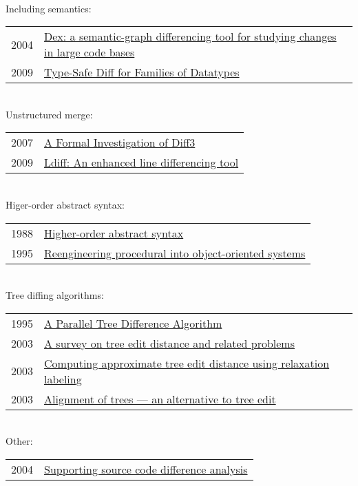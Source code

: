 \documentclass[12pt]{article}
\begin{document}
\\
Including semantics: \\
\begin{tabular}{ | l | l | }
	2004 & \href{http://ieeexplore.ieee.org/xpls/abs_all.jsp?arnumber=1357803&tag=1}{Dex: a semantic-graph differencing tool for studying changes in large code bases } \\
	2009 & \href{http://www.andres-loeh.de/gdiff-wgp.pdf}{Type-Safe Diff for Families of Datatypes } \\
\end{tabular}
\\
Unstructured merge: \\
\begin{tabular}{ | l | l | }
	2007 & \href{http://www.cis.upenn.edu/~bcpierce/papers/diff3-short.pdf}{A Formal Investigation of Diff3 } \\
	2009 & \href{http://ieeexplore.ieee.org/xpl/articleDetails.jsp?tp=&arnumber=5070564}{Ldiff: An enhanced line differencing tool } \\
\end{tabular}
\\
Higer-order abstract syntax: \\
\begin{tabular}{ | l | l | }
	1988 & \href{http://dl.acm.org/citation.cfm?id=54010}{Higher-order abstract syntax} \\
	1995 & \href{http://ieeexplore.ieee.org/xpls/abs_all.jsp?arnumber=514712&tag=1}{Reengineering procedural into object-oriented systems} \\	
\end{tabular}
\\
Tree diffing algorithms: \\
\begin{tabular}{ | l | l | }
	1995 & \href{http://citeseerx.ist.psu.edu/viewdoc/summary?doi=10.1.1.48.8675}{A Parallel Tree Difference Algorithm } \\
	2003 & \href{http://citeseerx.ist.psu.edu/viewdoc/summary?doi=10.1.1.128.7059}{A survey on tree edit distance and related problems } \\
	2003 & \href{http://www.sciencedirect.com/science/article/pii/S0167865502002556}{Computing approximate tree edit distance using relaxation labeling} \\
	2003 & \href{http://www.sciencedirect.com/science/article/pii/0304397595800299}{Alignment of trees — an alternative to tree edit} \\
\end{tabular}
\\
Other: \\
\begin{tabular}{ | l | l | }
	2004 & \href{http://ieeexplore.ieee.org/xpls/abs_all.jsp?arnumber=1357805}{Supporting source code difference analysis } \\
\end{tabular}








\end{document}

